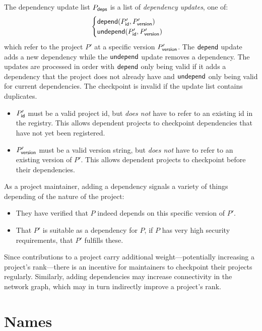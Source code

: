 The dependency update list $P_{\mathsf{deps}}$ is a list of \emph{dependency
  updates}, one of:
\[
    \begin{cases}
        \mathsf{depend}(P'_{\mathsf{id}}, P'_{\mathsf{version}}) \\
        \mathsf{undepend}(P'_{\mathsf{id}}, P'_{\mathsf{version}})
    \end{cases}
\]
which refer to the project $P'$ at a specific version $P'_{\mathsf{version}}$.
The $\mathsf{depend}$ update adds a new dependency while the $\mathsf{undepend}$ update removes
a dependency. The updates are processed in order with $\mathsf{depend}$ only being
valid if it adds a dependency that the project does not already have and
$\mathsf{undepend}$ only being valid for current dependencies. The checkpoint is
invalid if the update list contains duplicates.


\bigskip
\validation
\begin{itemize}
    \item $P'_{\mathsf{id}}$ must be a valid project id, but \emph{does not}
        have to refer to an existing id in the registry. This allows dependent
        projects to checkpoint dependencies that have not yet been registered.
    \item $P'_{\mathsf{version}}$ must be a valid version string, but \emph{does not}
        have to refer to an existing version of $P'$. This allows dependent projects
        to checkpoint before their dependencies.
\end{itemize}
As a project maintainer, adding a dependency signals a variety of things
depending of the nature of the project:
\begin{itemize}
\item They have verified that $P$ indeed depends on this specific
  version of $P'$.
\item That $P'$ is suitable as a dependency for $P$, \eg{} if $P$ has
  very high security requirements, that $P'$ fulfills these.
\end{itemize}
\noindent Since contributions to a project carry additional
weight---potentially increasing a project's rank---there is an incentive
for maintainers to checkpoint their projects regularly.  Similarly, adding
dependencies may increase connectivity in the network graph, which may in turn
indirectly improve a project's rank.

\section{Names}

